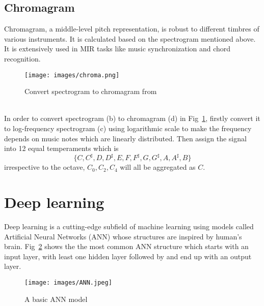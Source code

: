 \documentclass[a4paper, 11pt]{report}
\begin{document}
\subsection{Chromagram}
Chromagram, a middle-level pitch representation, is robust to different timbres of various instruments. It is calculated based on the spectrogram mentioned above. It is extensively used in MIR tasks like music synchronization and chord recognition.
 \begin{figure}[h]
 	\caption{Convert spectrogram to chromagram from \protect{} }
 	\centering
 	\texttt{[image: images/chroma.png]}
 	\label{fig:chroma}
 \end{figure}\\
 In order to convert spectrogram (b) to chromagram (d) in Fig~\ref{fig:chroma}, firstly convert it to log-frequency spectrogram (c) using logarithmic scale to make the frequency depends on music notes which are linearly distributed. Then assign the signal into 12 equal temperaments which is
$$\{C, C^\sharp, D, D^\sharp, E ,F, F^\sharp, G, G^\sharp, A, A^\sharp, B\}$$
irrespective to the octave, $C_{0}, C_{2}, C_{4}$ will all be aggregated as $C$.
\section{Deep learning}
Deep learning is a cutting-edge subfield of machine learning using models called Artificial Neural Networks (ANN) whose structures are inspired by human's brain. Fig~\ref{fig:ann} shows the the most common ANN structure which starts with an input layer, with least one hidden layer followed by and end up with an output layer.
 \begin{figure}[h]
 	\caption{A basic ANN model }
 	\centering
 	\texttt{[image: images/ANN.jpeg]}
 	\label{fig:ann}
 \end{figure}\\
\end{document}
